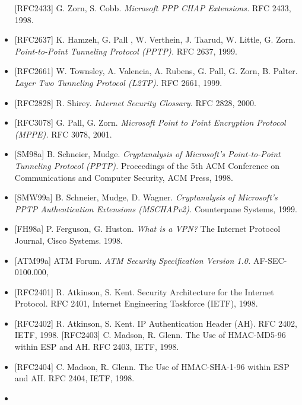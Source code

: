 \documentclass[a4paper]{article}
\begin{document}
\begin{multicols}{3}
\begin{itemize}
              {[}RFC2433{]} G. Zorn, S. Cobb. \emph{Microsoft PPP CHAP Extensions.}
              RFC 2433, 1998.
        \item
              {[}RFC2637{]} K. Hamzeh, G. Pall , W. Verthein, J. Taarud, W. Little,
              G. Zorn. \emph{Point-to-Point Tunneling Protocol (PPTP).} RFC 2637,
              1999.
        \item
              {[}RFC2661{]} W. Townsley, A. Valencia, A. Rubens, G. Pall, G. Zorn,
              B. Palter. \emph{Layer Two Tunneling Protocol (L2TP).} RFC 2661, 1999.
        \item
              {[}RFC2828{]} R. Shirey. \emph{Internet Security Glossary.} RFC 2828,
              2000.
        \item
              {[}RFC3078{]} G. Pall, G. Zorn. \emph{Microsoft Point to Point
                  Encryption Protocol (MPPE).} RFC 3078, 2001.
        \item
              {[}SM98a{]} B. Schneier, Mudge. \emph{Cryptanalysis of Microsoft's
                  Point-to-Point Tunneling Protocol (PPTP).} Proceedings of the 5th ACM
              Conference on Communications and Computer Security, ACM Press, 1998.
        \item
              {[}SMW99a{]} B. Schneier, Mudge, D. Wagner. \emph{Cryptanalysis of
                  Microsoft's PPTP Authentication Extensions (MSCHAPv2).} Counterpane
              Systems, 1999.
        \item
              {[}FH98a{]} P. Ferguson, G. Huston. \emph{What is a VPN?} The Internet
              Protocol Journal, Cisco Systems. 1998.
        \item
              {[}ATM99a{]} ATM Forum. \emph{ATM Security Specification Version 1.0.}
              AF-SEC-0100.000,
        \item
              {[}RFC2401{]} R. Atkinson, S. Kent. Security Architecture for the
              Internet Protocol. RFC 2401, Internet Engineering Taskforce (IETF),
              1998.
        \item
              {[}RFC2402{]} R. Atkinson, S. Kent. IP Authentication Header (AH). RFC
              2402, IETF, 1998. {[}RFC2403{]} C. Madson, R. Glenn. The Use of
              HMAC-MD5-96 within ESP and AH. RFC 2403, IETF, 1998.
        \item
              {[}RFC2404{]} C. Madson, R. Glenn. The Use of HMAC-SHA-1-96 within ESP
              and AH. RFC 2404, IETF, 1998.
        \item

\end{itemize}
\end{multicols}
\end{document}
